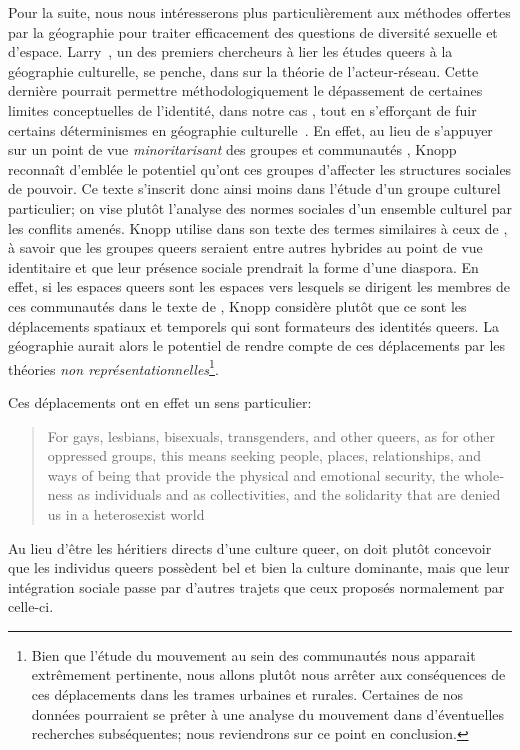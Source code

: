 Pour la suite, nous nous intéresserons plus particulièrement aux méthodes offertes par la géographie pour traiter efficacement des questions de diversité sexuelle et d'espace.
Larry~\citet{Knopp2004}, un des premiers chercheurs à lier les études queers à la géographie culturelle, se penche, dans  sur la théorie de l'acteur-réseau.
Cette dernière pourrait permettre méthodologiquement le dépassement de certaines limites conceptuelles de l'identité, dans notre cas \lgbt{}, tout en s’efforçant de fuir certains déterminismes en géographie culturelle~\citep{Knopp2004}.
En effet, au lieu de s'appuyer sur un point de vue \emph{minoritarisant} des groupes et communautés \lgbt{}, Knopp reconnaît d'emblée le potentiel qu'ont ces groupes d'affecter les structures sociales de pouvoir.
Ce texte s'inscrit donc ainsi moins dans l'étude d'un groupe culturel particulier; on vise plutôt l'analyse des normes sociales d'un ensemble culturel par les conflits amenés.
Knopp utilise dans son texte des termes similaires à ceux de \citet{Sinfield1996}, à savoir que les groupes queers seraient entre autres hybrides au point de vue identitaire et que leur présence sociale prendrait la forme d'une diaspora.
En effet, si les espaces queers sont les espaces vers lesquels se dirigent les membres de ces communautés dans le texte de \citet{Sinfield1996}, Knopp considère plutôt que ce sont les déplacements spatiaux et temporels qui sont formateurs des identités queers.
La géographie aurait alors le potentiel de rendre compte de ces déplacements par les théories \emph{non représentationnelles}\footnote{Bien que l'étude du mouvement au sein des communautés \lgbt{} nous apparait extrêmement pertinente, nous allons plutôt nous arrêter aux conséquences de ces déplacements dans les trames urbaines et rurales. Certaines de nos données pourraient se prêter à une analyse du mouvement dans d'éventuelles recherches subséquentes; nous reviendrons sur ce point en conclusion.}.

Ces déplacements ont en effet un sens particulier: \foreignblockquote{english}[{\cite[123]{Knopp2004}}][.]{For gays, lesbians, bisexuals, transgenders, and other queers, as for other oppressed groups, this means seeking people, places, relationships, and ways of being that provide the physical and emotional security, the wholeness as individuals and as collectivities, and the solidarity that are denied us in a heterosexist world}
Au lieu d'être les héritiers directs d'une culture queer{}, on doit plutôt concevoir que les individus queers{} possèdent bel et bien la culture dominante, mais que leur intégration sociale passe par d'autres trajets que ceux proposés normalement par celle-ci.

